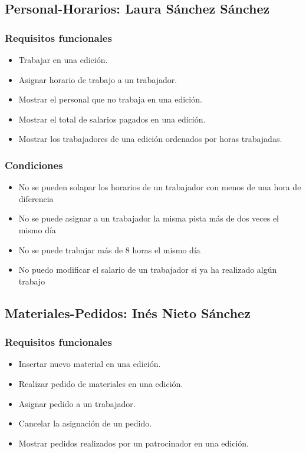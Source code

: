 \subsection{Personal-Horarios: Laura Sánchez Sánchez}
\subsubsection{Requisitos funcionales}
\begin{itemize}
	\item Trabajar en una edición.
	\item Asignar horario de trabajo a un trabajador.
	\item Mostrar el personal que no trabaja en una edición.
	\item Mostrar el total de salarios pagados en una edición.
	\item Mostrar los trabajadores de una edición ordenados por horas trabajadas.
\end{itemize}

\subsubsection{Condiciones}
\begin{itemize}
	\item No se pueden solapar los horarios de un trabajador con menos de una hora de diferencia
	\item No se puede asignar a un trabajador la misma pista más de dos veces el mismo día
	\item No se puede trabajar más de 8 horas el mismo día
	\item No puedo modificar el salario de un trabajador si ya ha realizado algún trabajo
\end{itemize}

\subsection{Materiales-Pedidos: Inés Nieto Sánchez}
\subsubsection{Requisitos funcionales}
\begin{itemize}
	\item Insertar nuevo material en una edición.
	\item Realizar pedido de materiales en una edición.
	\item Asignar pedido a un trabajador.
	\item Cancelar la asignación de un pedido.
	\item Mostrar pedidos realizados por un patrocinador en una edición.
\end{itemize}

